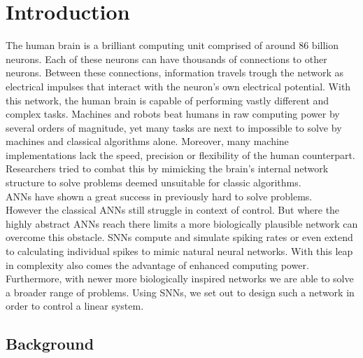 \chapter{Introduction}

The human brain is a brilliant computing unit comprised of around 86 billion\cite{azevedo_equal_2009} neurons. Each of these neurons can have thousands of connections to other neurons. Between these connections, information travels trough the network as electrical impulses that interact with the neuron's own electrical potential. With this network, the human brain is capable of performing vastly different and complex tasks. Machines and robots beat humans in raw computing power by several orders of magnitude, yet many tasks are next to impossible to solve by machines and classical algorithms alone. Moreover, many machine implementations lack the speed, precision or flexibility of the human counterpart.\\
Researchers tried to combat this by mimicking the brain's internal network structure to solve problems deemed unsuitable for classic algorithms.\\
\acp{ANN} have shown a great success in previously hard to solve problems.\\
However the classical \acp{ANN} still struggle in context of control.
But where the highly abstract \acp{ANN} reach there limits a more biologically plausible network can overcome this obstacle.
\acp{SNN} compute and simulate spiking rates or even extend to calculating individual spikes to mimic natural neural networks. With this leap in complexity also comes the advantage of enhanced computing power. Furthermore, with newer more biologically inspired networks we are able to solve a broader range of problems. Using \acp{SNN}, we set out to design such a network in order to control a linear system.  \\

\section{Background}\label{sec:background}

